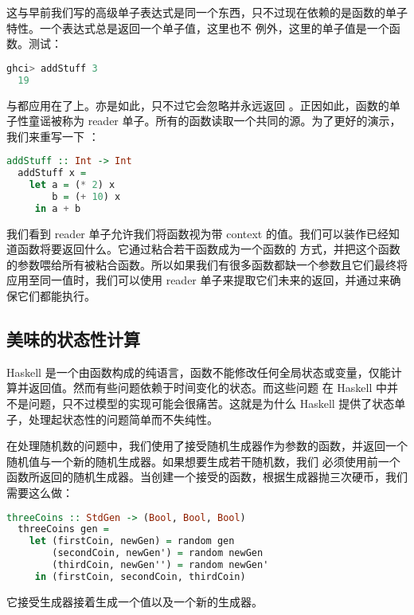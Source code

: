 \documentclass[./main.tex]{subfiles}
\begin{document}
这与早前我们写的高级单子表达式是同一个东西，只不过现在依赖的是函数的单子特性。一个表达式总是返回一个单子值，这里也不
例外，这里的单子值是一个函数。测试：

\begin{lstlisting}[language=Haskell]
  ghci> addStuff 3
  19
\end{lstlisting}

与都应用在了上。亦是如此，只不过它会忽略并永远返回
。正因如此，函数的单子性童谣被称为 reader 单子。所有的函数读取一个共同的源。为了更好的演示，我们来重写一下
：

\begin{lstlisting}[language=Haskell]
  addStuff :: Int -> Int
  addStuff x =
    let a = (* 2) x
        b = (+ 10) x
     in a + b
\end{lstlisting}

我们看到 reader 单子允许我们将函数视为带 context 的值。我们可以装作已经知道函数将要返回什么。它通过粘合若干函数成为一个函数的
方式，并把这个函数的参数喂给所有被粘合函数。所以如果我们有很多函数都缺一个参数且它们最终将应用至同一值时，我们可以使用 reader
单子来提取它们未来的返回，并通过\acode{>>=}来确保它们都能执行。

\subsection*{美味的状态性计算}

Haskell 是一个由函数构成的纯语言，函数不能修改任何全局状态或变量，仅能计算并返回值。然而有些问题依赖于时间变化的状态。而这些问题
在 Haskell 中并不是问题，只不过模型的实现可能会很痛苦。这就是为什么 Haskell 提供了状态单子，处理起状态性的问题简单而不失纯性。

在处理随机数的问题中，我们使用了接受随机生成器作为参数的函数，并返回一个随机值与一个新的随机生成器。如果想要生成若干随机数，我们
必须使用前一个函数所返回的随机生成器。当创建一个接受的函数，根据生成器抛三次硬币，我们需要这么做：

\begin{lstlisting}[language=Haskell]
  threeCoins :: StdGen -> (Bool, Bool, Bool)
  threeCoins gen =
    let (firstCoin, newGen) = random gen
        (secondCoin, newGen') = random newGen
        (thirdCoin, newGen'') = random newGen'
     in (firstCoin, secondCoin, thirdCoin)
\end{lstlisting}

它接受生成器接着生成一个值以及一个新的生成器。
\end{document}
